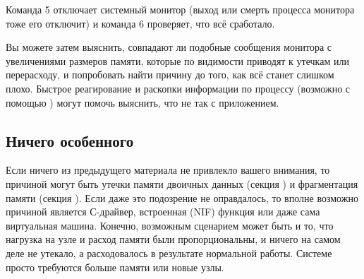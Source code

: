 Команда 5 отключает системный монитор (выход или смерть процесса монитора тоже его отключит) и команда 6 проверяет, что всё сработало.

Вы можете затем выяснить, совпадают ли подобные сообщения монитора с увеличениями размеров памяти, которые по видимости приводят к утечкам или перерасходу, и попробовать найти причину до того, как всё станет слишком плохо. Быстрое реагирование и раскопки информации по процессу (возможно с помощью ) могут помочь выяснить, что не так с приложением.


\subsection{Ничего особенного}

Если ничего из предыдущего материала не привлекло вашего внимания, то причиной могут быть утечки памяти двоичных данных (секция ) и фрагментация памяти (секция ). Если даже это подозрение не оправдалось, то вполне возможно причиной является С-драйвер, встроенная (NIF) функция или даже сама виртуальная машина. Конечно, возможным сценарием может быть и то, что нагрузка на узле и расход памяти были пропорциональны, и ничего на самом деле не утекало, а расходовалось в результате нормальной работы. Системе просто требуются больше памяти или новые узлы.

